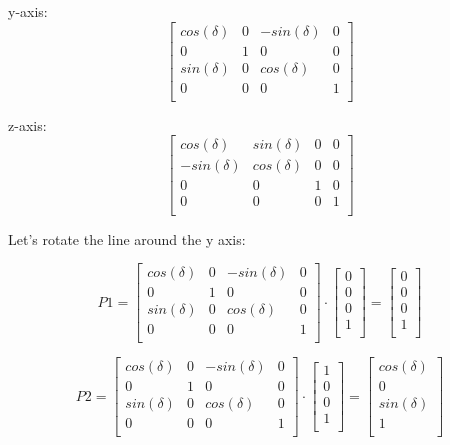 \documentclass[12pt]{report} \usepackage{preamble}
\begin{document}
y-axis: \[
	\begin{bmatrix}
		cos(\delta) & 0 & -sin(\delta) & 0 \\
		0           & 1 & 0            & 0 \\
		sin(\delta) & 0 & cos(\delta)  & 0 \\
		0           & 0 & 0            & 1 \\
	\end{bmatrix}
\]

z-axis: \[
	\begin{bmatrix}
		cos(\delta)  & sin(\delta) & 0 & 0 \\
		-sin(\delta) & cos(\delta) & 0 & 0 \\
		0            & 0           & 1 & 0 \\
		0            & 0           & 0 & 1 \\
	\end{bmatrix}
\]

Let's rotate the line around the y axis:

\[
	P1 =
	\begin{bmatrix}
		cos(\delta) & 0 & -sin(\delta) & 0 \\
		0           & 1 & 0            & 0 \\
		sin(\delta) & 0 & cos(\delta)  & 0 \\
		0           & 0 & 0            & 1 \\
	\end{bmatrix}
	\cdot
	\begin{bmatrix}
		0 \\
		0 \\
		0 \\
		1 \\
	\end{bmatrix}
	=
	\begin{bmatrix}
		0 \\
		0 \\
		0 \\
		1 \\
	\end{bmatrix}
\]

\[
	P2 =
	\begin{bmatrix}
		cos(\delta) & 0 & -sin(\delta) & 0 \\
		0           & 1 & 0            & 0 \\
		sin(\delta) & 0 & cos(\delta)  & 0 \\
		0           & 0 & 0            & 1 \\
	\end{bmatrix}
	\cdot
	\begin{bmatrix}
		1 \\
		0 \\
		0 \\
		1 \\
	\end{bmatrix}
	=
	\begin{bmatrix}
		cos(\delta) \\
		0           \\
		sin(\delta) \\
		1           \\
	\end{bmatrix}
\]
\end{document}
